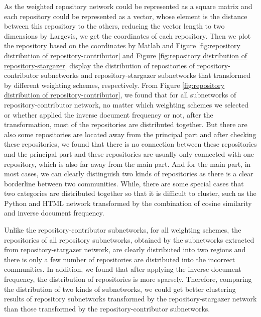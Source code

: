 \documentclass[12pt,oneside,final]{vlsithesis}
\begin{document}
 As the weighted repository network could be represented as a square matrix and each repository could be represented as a vector, whose element is the distance between this repository to the others, reducing the vector length to two dimensions by Largevis, we get the coordinates of each repository. Then we plot the repository based on the coordinates by Matlab and Figure \ref{fig:repository distribution of repository-contributor} and Figure \ref{fig:repository distribution of repository-stargazer} display the distribution of repositories of repository-contributor subnetworks and repository-stargazer subnetworks that transformed by different weighting schemes, respectively. From Figure \ref{fig:repository distribution of repository-contributor}, we found that for all subnetworks of repository-contributor network, no matter which weighting schemes we selected or whether applied the inverse document frequency or not, after the transformation, most of the repositories are distributed together. But there are also some repositories are located away from the principal part and after checking these repositories, we found that there is no connection between these repositories and the principal part and these repositories are usually only connected with one repository, which is also far away from the main part. And for the main part, in most cases, we can clearly distinguish two kinds of repositories as there is a clear borderline between two communities. While, there are some special cases that two categories are distributed together so that it is difficult to cluster, such as the Python and HTML network transformed by the combination of cosine similarity and inverse document frequency. 

Unlike the repository-contributor subnetworks, for all weighting schemes, the repositories of all repository subnetworks, obtained by the subnetworks extracted from repository-stargazer network, are clearly distributed into two regions and there is only a few number of repositories are distributed into the incorrect communities. In addition, we found that after applying the inverse document frequency, the distribution of repositories is more sparsely. Therefore, comparing the distribution of two kinds of subnetworks, we could get better clustering results of repository subnetworks transformed by the repository-stargazer network than those transformed by the repository-contributor subnetworks.
\begin{figure*}
	\centering
	\caption{Repository distribution of subnetworks transformed from repository-contributor networks}
	\label{fig:repository distribution of repository-contributor}
\end{figure*}
\end{document}
